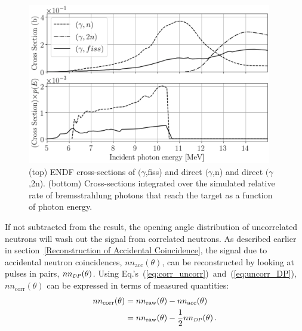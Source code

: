 \begin{figure}[]
\centering
    \includegraphics[width=0.95\textwidth]{Content/Methods/CrossSections.png}
    \caption{(top) ENDF cross-sections of $(\gamma$,fiss) and direct $(\gamma$,n) and direct $(\gamma$,2n).
    (bottom) Cross-sections integrated over the simulated relative rate of bremsstrahlung photons that reach the target as a function of photon energy.}
    \label{fig:CrossSection}
\end{figure}

If not subtracted from the result, the opening angle distribution of uncorrelated neutrons will wash out the signal from correlated neutrons. 
As described earlier in section~\ref{Reconstruction of Accidental Coincidence}, the signal due to accidental neutron coincidences, $nn_{\text{acc}}(\theta)$, can be reconstructed by looking at pulses in pairs, $nn_{\scaleto{DP}{4pt}}(\theta)$.
Using Eq.'s~(\ref{eq:corr_uncorr})~and~(\ref{eq:uncorr_DP}),  $nn_{\text{corr}}(\theta)$ can be expressed in terms of measured quantities:
\begin{equation} \label{math:SP}
    \begin{split}
    nn_{\text{corr}}(\theta) &=  nn_{\text{raw}}(\theta) - nn_{\text{acc}}(\theta) \\
    &= nn_{\text{raw}}(\theta) - \frac{1}{2}nn_{\scaleto{DP}{4pt}}(\theta) \, .
    \end{split}
\end{equation}

